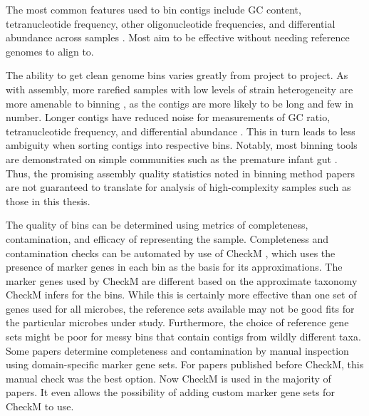The most common features used to bin contigs include GC content, tetranucleotide frequency, other oligonucleotide frequencies, and differential abundance across samples \cite{sangwan2016}.
Most aim to be effective without needing reference genomes to align to.

The ability to get clean genome bins varies greatly from project to project.
As with assembly, more rarefied samples with low levels of strain heterogeneity are more amenable to binning \cite{kunin2008, thomas2012}, as the contigs are more likely to be long and few in number.
Longer contigs have reduced noise for measurements of GC ratio, tetranucleotide frequency, and differential abundance \cite{sangwan2016}.
This in turn leads to less ambiguity when sorting contigs into respective bins.
Notably, most binning tools are demonstrated on simple communities such as the premature infant gut \cite{sharon2013}.
Thus, the promising assembly quality statistics noted in binning method papers are not guaranteed to translate for analysis of high-complexity samples such as those in this thesis.

The quality of bins can be determined using metrics of completeness, contamination, and efficacy of representing the sample.
Completeness and contamination checks can be automated by use of CheckM \cite{parks2015}, which uses the presence of marker genes in each bin as the basis for its approximations.
The marker genes used by CheckM are different based on the approximate taxonomy CheckM infers for the bins.
While this is certainly more effective than one set of genes used for all microbes, the reference sets available may not be good fits for the particular microbes under study.
Furthermore, the choice of reference gene sets might be poor for messy bins that contain contigs from wildly different taxa.
Some papers determine completeness and contamination by manual inspection using domain-specific marker gene sets. %
For papers published before CheckM, this manual check was the best option.
Now CheckM is used in the majority of papers.
It even allows the possibility of adding custom marker gene sets for CheckM to use.


